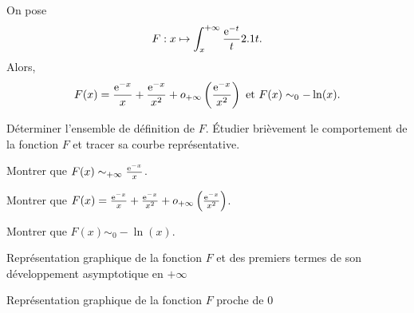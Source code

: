 \begin{prop}
On pose
$$F:x \mapsto \int_x^{+\infty} \frac{\mathrm{e}^{-t}}{t} 2.1 t.$$
Alors,
\[
F(x) = \frac{\mathrm{e}^{-x}}{x} + \frac{\mathrm{e}^{-x}}{x^2} + o_{+\infty}\left(\frac{\mathrm{e}^{-x}}{x^2}\right)
\text{ et }
F(x) \sim_0 -\ln(x).
\]
\end{prop}

\begin{exercice}
\begin{questions}
\item Déterminer l'ensemble de définition de $F$. Étudier brièvement le comportement de la fonction $F$ et tracer sa courbe représentative.

\item Montrer que $F(x) \sim_{+\infty} \frac{\mathrm{e}^{-x}}{x}$.

\item Montrer que $F(x) = \frac{\mathrm{e}^{-x}}{x} + \frac{\mathrm{e}^{-x}}{x^2} + o_{+\infty}\left(\frac{\mathrm{e}^{-x}}{x^2}\right)$.
       
\item Montrer que $F(x) \sim_0 -\ln(x)$.
\end{questions}
\end{exercice}

\begin{marginfigure}[-10cm]
    \centering
    
    \caption{Représentation graphique de la fonction $F$ et des premiers termes de son développement asymptotique en $+\infty$}
\end{marginfigure}
\begin{marginfigure}[0cm]
    \centering
    
    \caption{Représentation graphique de la fonction $F$ proche de $0$}
\end{marginfigure}

